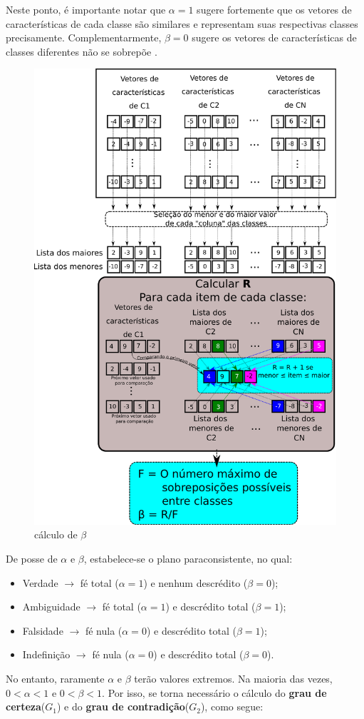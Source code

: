 \documentclass[a4paper,12pt,openright,oneside]{book}
\newenvironment{myenv}[1]
{\begin{spacing}{#1}}
	{\end{spacing}}
\begin{document}
\begin{myenv}{1.5}
\par Neste ponto, é importante notar que $\alpha=1$ sugere fortemente que os vetores de características de cada classe são similares e representam suas respectivas classes precisamente. Complementarmente, $\beta=0$ sugere os vetores de características de classes diferentes não se sobrepõe \cite{8588433}.
\begin{figure}[H]
\centering
\includegraphics[width=0.55\linewidth]{images/betaCalculation.pdf}
\caption{cálculo de $\beta$}
\label{fig:betacalculation}
\end{figure}
De posse de $\alpha$ e $\beta$, estabelece-se o plano paraconsistente, no qual:
\begin{itemize}
\item Verdade $\rightarrow$ fé total ($\alpha = 1$) e nenhum descrédito ($\beta = 0$);
\item Ambiguidade $\rightarrow$ fé total ($\alpha = 1$) e descrédito total ($\beta = 1$);
\item Falsidade $\rightarrow$ fé nula ($\alpha = 0$) e descrédito total ($\beta = 1$);
\item Indefinição $\rightarrow$ fé nula ($\alpha = 0$) e descrédito total ($\beta = 0$).
\end{itemize}
\par No entanto, raramente $\alpha$ e $\beta$ terão valores extremos. Na maioria das vezes, $0 < \alpha < 1$ e $0 < \beta < 1$. Por isso, se torna necessário o cálculo do \textbf{grau de certeza}($G_1$) e do \textbf{grau de contradição}($G_2$), como segue:

\end{myenv}
\end{document}

